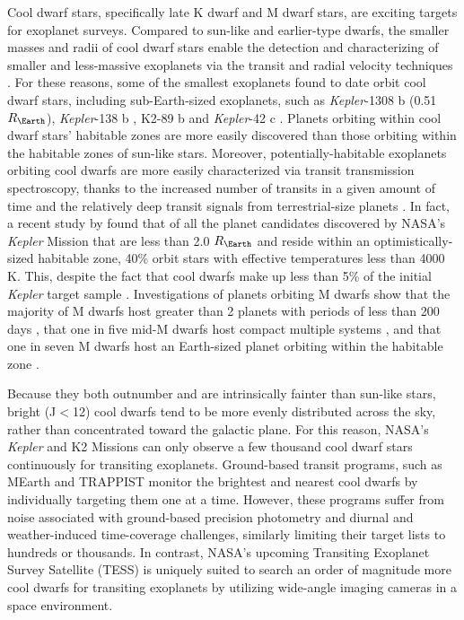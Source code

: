 \documentclass[twocolumn]{aastex62}
\begin{document}
Cool dwarf stars, specifically late K dwarf and M dwarf stars, are exciting targets for exoplanet surveys.  Compared to sun-like and earlier-type dwarfs, the smaller masses and radii of cool dwarf stars enable the detection and characterizing of smaller and less-massive exoplanets via the transit and radial velocity techniques \citep[e.g.][]{Nutzman2008, Muirhead2011}.  For these reasons, some of the smallest exoplanets found to date orbit cool dwarf stars, including sub-Earth-sized exoplanets, such as {\it Kepler}-1308 b (0.51 $R_{\Earth}$), {\it Kepler}-138 b \citep[0.52 $R_{\Earth}$, both from][]{Morton2016}, K2-89 b \citep[0.62 $R_{\Earth}$,][]{Crossfield2016} and {\it Kepler}-42 c \citep[0.73 $R_{\Earth}$,][]{Muirhead2012a,Mann2017}.  Planets orbiting within cool dwarf stars' habitable zones are more easily discovered than those orbiting within the habitable zones of sun-like stars.  Moreover, potentially-habitable exoplanets orbiting cool dwarfs are more easily characterized via transit transmission spectroscopy, thanks to the increased number of transits in a given amount of time and the relatively deep transit signals from terrestrial-size planets \citep[][]{Kaltenegger2009,Belu2011}.  In fact, a recent study by \citet[][]{Kane2016} found that of all the planet candidates discovered by NASA's {\it Kepler} Mission that are less than 2.0 $R_\Earth$ and reside within an optimistically-sized habitable zone, 40\% orbit stars with effective temperatures less than 4000 K.  This, despite the fact that cool dwarfs make up less than 5\% of the initial {\it Kepler} target sample \citep[][]{Batalha2010}.  Investigations of planets orbiting M dwarfs show that the majority of M dwarfs host greater than 2 planets with periods of less than 200 days \citep[e.g.][]{Dressing2013,Gaidos2014}, that one in five mid-M dwarfs host compact multiple systems \citep[][]{Muirhead2015}, and that one in seven M dwarfs host an Earth-sized planet orbiting within the habitable zone \citep[][]{Dressing2015}.

Because they both outnumber and are intrinsically fainter than sun-like stars, bright (J$<$12) cool dwarfs tend to be more evenly distributed across the sky, rather than concentrated toward the galactic plane.  For this reason, NASA's {\it Kepler} and K2 Missions can only observe a few thousand cool dwarf stars continuously for transiting exoplanets.  Ground-based transit programs, such as MEarth \citep[e.g.][]{Berta2013} and TRAPPIST \citep[e.g.][]{Gillon2012} monitor the brightest and nearest cool dwarfs by individually targeting them one at a time.  However, these programs suffer from noise associated with ground-based precision photometry and diurnal and weather-induced time-coverage challenges, similarly limiting their target lists to hundreds or thousands.  In contrast, NASA's upcoming Transiting Exoplanet Survey Satellite (TESS) is uniquely suited to search an order of magnitude more cool dwarfs for transiting exoplanets by utilizing wide-angle imaging cameras in a space environment.  
\end{document}
